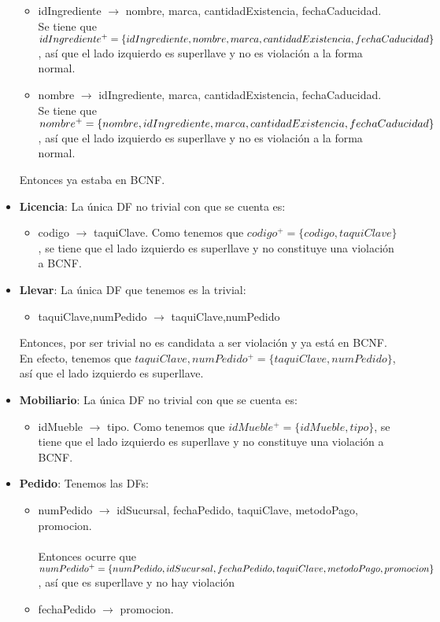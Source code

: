 \documentclass[11pt,letterpaper]{article}
\begin{document}
\begin{itemize}
\begin{itemize}
\item idIngrediente $\rightarrow$ nombre, marca, cantidadExistencia, fechaCaducidad.\\Se tiene que $idIngrediente^+=\{idIngrediente,nombre, marca,\\cantidadExistencia, fechaCaducidad\}$, así que el lado izquierdo es superllave y no es violación a la forma normal. \checkmark
\item nombre  $\rightarrow$  idIngrediente, marca, cantidadExistencia, fechaCaducidad.\\Se tiene que $nombre^+=\{nombre,idIngrediente, marca, \\cantidadExistencia, fechaCaducidad\}$, así que el lado izquierdo es superllave y no es violación a la forma normal. \checkmark
\end{itemize}

Entonces ya estaba en BCNF.
\item \textbf{Licencia}: La única DF no trivial con que se cuenta es:
\begin{itemize}
\item codigo $\rightarrow$ taquiClave. Como tenemos que $codigo^+ = \{codigo,taquiClave\}$, se tiene que el lado izquierdo es superllave y no constituye una violación a BCNF. \checkmark
\end{itemize}
\item \textbf{Llevar}: La única DF que tenemos es la trivial:

\begin{itemize}
\item taquiClave,numPedido $\rightarrow$ taquiClave,numPedido
\end{itemize}

Entonces, por ser trivial no es candidata a ser violación y ya está en BCNF. En efecto, tenemos que $taquiClave,numPedido^+ = \{taquiClave,numPedido\}$, así que el lado izquierdo es superllave. \checkmark
\item \textbf{Mobiliario}: La única DF no trivial con que se cuenta es:
\begin{itemize}
\item idMueble $\rightarrow$ tipo. Como tenemos que $idMueble^+ = \{idMueble,tipo\}$, se tiene que el lado izquierdo es superllave y no constituye una violación a BCNF. \checkmark
\end{itemize}
\item \textbf{Pedido}: Tenemos las DFs:

\begin{itemize}
\item numPedido $\rightarrow$ idSucursal, fechaPedido, taquiClave, metodoPago, promocion. \\\\Entonces ocurre que $numPedido^+ = \{numPedido,idSucursal, fechaPedido, taquiClave,\\ metodoPago, promocion\}$, así que es superllave y no hay violación \checkmark
\item fechaPedido $\rightarrow$ promocion. \\\\


\end{itemize}
\end{itemize}
\end{document}
